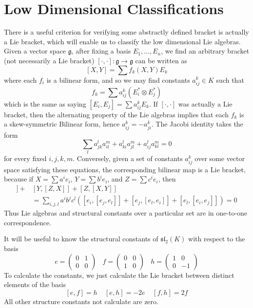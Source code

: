 \section{Low Dimensional Classifications}

There is a useful criterion for verifying some abstractly defined bracket is actually a Lie bracket, which will enable us to classify the low dimensional Lie algebras. Given a vector space $\mathfrak{g}$, after fixing a basis $E_1, \dots, E_n$, we find an arbitrary bracket (not necessarily a Lie bracket) $[\cdot, \cdot]: \mathfrak{g} \to \mathfrak{g}$ can be written as
%
\[ [X,Y] = \sum f_k(X,Y) E_k \]
%
where each $f_i$ is a bilinear form, and so we may find constants $a_{ij}^k \in K$ such that
%
\[ f_k = \sum a^k_{ij} ( E_i^* \otimes E_j^* ) \]
%
which is the same as saying $[E_i, E_j] = \sum a_{ij}^k E_k$. If $[\cdot, \cdot]$ was actually a Lie bracket, then the alternating property of the Lie algebras implies that each $f_k$ is a skew-symmetric Bilinear form, hence $a_{ij}^k = -a_{ji}^k$. The Jacobi identity takes the form
%
\[ \sum_l a_{jk}^l a_{il}^m + a_{ki}^l a_{jl}^m + a_{ij}^l a_{kl}^m = 0 \]
%
for every fixed $i,j,k,m$. Conversely, given a set of constants $a^k_{ij}$ over some vector space satisfying these equations, the corresponding bilinear map is a Lie bracket, because if $X = \sum a^i e_i$, $Y = \sum b^i e_i$, and $Z = \sum c^i e_i$, then
%
\begin{align*}
    [X,[Y,Z]] + &[Y,[Z,X]] + [Z,[X,Y]]\\
    &= \sum_{i,j,l} a^i b^j c^l \left( [e_i,[e_j,e_l]] + [e_j,[e_l,e_i]] + [e_l,[e_i,e_j]] \right) = 0
\end{align*}
%
Thus Lie algebras and structural constants over a particular set are in one-to-one correspondence.

\begin{example}
    It will be useful to know the structural constants of $\mathfrak{sl}_2(K)$ with respect to the basis
    \[ e = \begin{pmatrix} 0 & 1 \\ 0 & 0 \end{pmatrix}\ \ \ \ f = \begin{pmatrix} 0 & 0 \\ 1 & 0 \end{pmatrix}\ \ \ \ h = \begin{pmatrix} 1 & 0 \\ 0 & -1 \end{pmatrix} \]
    To calculate the constants, we just calculate the Lie bracket between distinct elements of the basis
    \[ [e,f] = h\ \ \ \ \ [e,h] = -2e\ \ \ \ \ [f,h] = 2f \]
    All other structure constants not calculate are zero.
\end{example}

